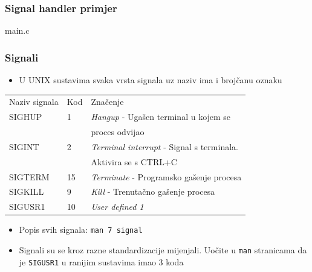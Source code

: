\documentclass[table,usenames,dvipsnames]{beamer}
\newcommand{\shell}[1]{\texttt{#1}}
\begin{document}

\begin{frame}[t]
	\frametitle{Signal handler primjer}
	\begin{block}{main.c}
		\makeset
	\end{block}
\end{frame}

\begin{frame}[t]
	\frametitle{Signali}
	\begin{itemize}
		\item U UNIX sustavima svaka vrsta signala uz naziv ima i brojčanu oznaku
	\end{itemize}
	\begin{table}[h]
		\begin{tabular}{l l l}
			\rowcolor{BlueViolet!20}Naziv signala & Kod & Značenje \\
			SIGHUP & 1 & \emph{Hangup} - Ugašen terminal u kojem se \\ & & proces odvijao \\
			SIGINT & 2 & \emph{Terminal interrupt} - Signal s terminala. \\ & & Aktivira se s CTRL+C \\
			SIGTERM & 15 & \emph{Terminate} - Programsko gašenje procesa \\
			SIGKILL & 9 & \emph{Kill} - Trenutačno gašenje procesa \\
			SIGUSR1 & 10 & \emph{User defined 1} 
		\end{tabular}
	\end{table}
	\begin{itemize}
		\item Popis svih signala: \shell{man 7 signal}
		\item Signali su se kroz razne standardizacije mijenjali. Uočite u \shell{man} stranicama da je \shell{SIGUSR1} u ranijim sustavima imao 3 koda
	\end{itemize}
\end{frame}
\end{document}
